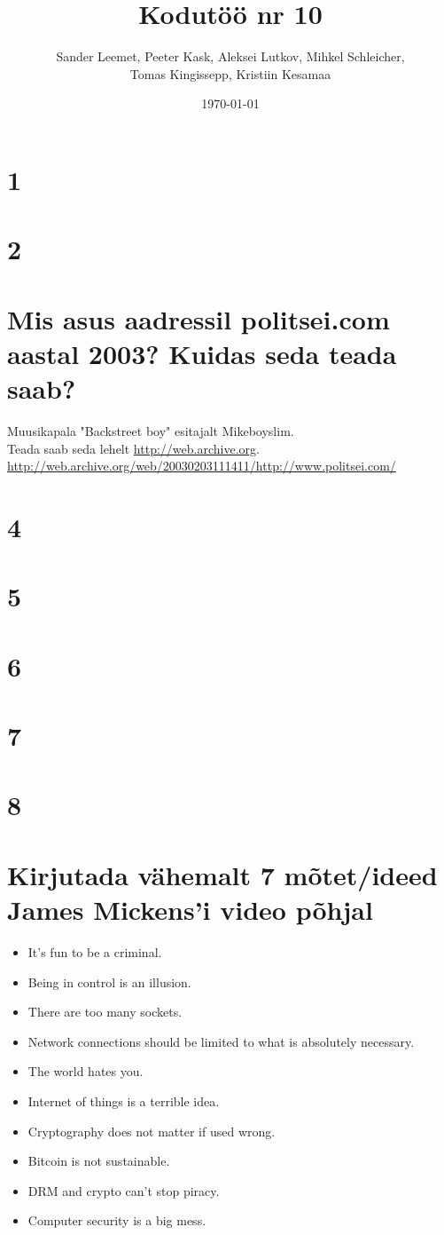 \documentclass{article}
\title{Kodutöö nr 10}
\author{Sander Leemet, Peeter Kask, Aleksei Lutkov, Mihkel Schleicher,\\ Tomas Kingissepp, Kristiin Kesamaa}
\date{\today}
\begin{document}
\maketitle

\section{1}
\section{2}

\section{Mis asus aadressil politsei.com aastal 2003? Kuidas seda teada saab?}
Muusikapala "Backstreet boy" esitajalt Mikeboyslim.\\
Teada saab seda lehelt \url{http://web.archive.org}.\\
\url{http://web.archive.org/web/20030203111411/http://www.politsei.com/}
\section{4}
\section{5}
\section{6}
\section{7}
\section{8}
\section{Kirjutada vähemalt 7 mõtet/ideed James Mickens'i video põhjal}
	\begin{itemize}
		\item{It's fun to be a criminal.}
		\item{Being in control is an illusion.}
		\item{There are too many sockets.}
		\item{Network connections should be limited to what is absolutely necessary.}
		\item{The world hates you.}
		\item{Internet of things is a terrible idea.}
		\item{Cryptography does not matter if used wrong.}
		\item{Bitcoin is not sustainable.}
		\item{DRM and crypto can't stop piracy.}
		\item{Computer security is a big mess.}
	\end{itemize}
\end{document}
